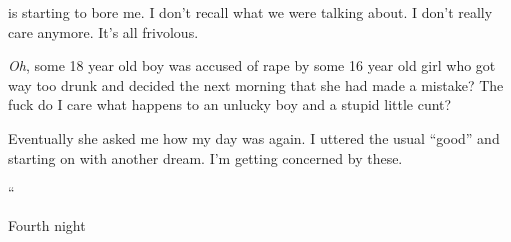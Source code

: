 \noindent
\april{} is starting to bore me.
I don't recall what we were talking about.
I don't really care anymore.  It's all frivolous.


\textit{Oh}, some 18 year old boy was accused of rape by some
16 year old girl who got way too drunk and decided the
next morning that she had made a mistake?
The fuck do I care what happens to an unlucky boy and
a stupid little cunt?


Eventually she asked me how my day was again.
I uttered the usual ``good'' and starting on with another dream.
I'm getting concerned by these.
\vspace*{3ex}


\begin{adjustwidth}{2em}{2em}
\noindent\Huge``\normalsize
\begin{adjustwidth}{1em}{1em}

\end{adjustwidth}
\end{adjustwidth}

\lhoarnob
\noindent
Fourth night
